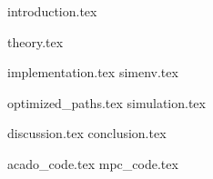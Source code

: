 \documentclass[]{report}
\numberwithin{equation}{chapter}
\begin{document}

\setcounter{page}{1}


\tableofcontents
{}
\newpage

\listoffigures									
{}
\clearpage

\setcounter{page}{1}
\pagestyle{fancy}

{introduction.tex}

{theory.tex}

{implementation.tex}
{simenv.tex}

{optimized_paths.tex}
{simulation.tex}

{discussion.tex}
{conclusion.tex}

\begin{appendices}
{acado_code.tex}
{mpc_code.tex}
\end{appendices}


\newpage


{}
\end{document}
